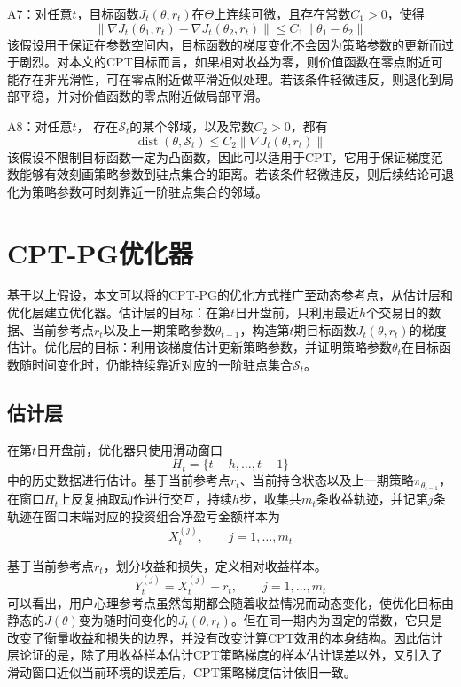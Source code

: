 A7：对任意$t$，目标函数$J_t(\theta,r_t)$在$\Theta$上连续可微，且存在常数$C_1>0$，使得
\begin{equation}
\|\nabla J_t(\theta_1,r_t)-\nabla J_t(\theta_2,r_t)\|
\le C_1\|\theta_1-\theta_2\|
\end{equation}
该假设用于保证在参数空间内，目标函数的梯度变化不会因为策略参数的更新而过于剧烈。对本文的CPT目标而言，如果相对收益为零，则价值函数在零点附近可能存在非光滑性，可在零点附近做平滑近似处理。若该条件轻微违反，则退化到局部平稳，并对价值函数的零点附近做局部平滑。

A8：对任意$t$，
存在$\mathcal S_t$的某个邻域，以及常数$C_2>0$，都有
\begin{equation}
\operatorname{dist}(\theta,\mathcal S_t)
\le
C_2\|\nabla J_t(\theta,r_t)\|
\end{equation}
该假设不限制目标函数一定为凸函数，因此可以适用于CPT，它用于保证梯度范数能够有效刻画策略参数到驻点集合的距离。若该条件轻微违反，则后续结论可退化为策略参数可时刻靠近一阶驻点集合的邻域。


\section{CPT-PG优化器}
基于以上假设，本文可以将\cite{Agnelli2017}的CPT-PG的优化方式推广至动态参考点，从估计层和优化层建立优化器。估计层的目标：在第$t$日开盘前，只利用最近$h$个交易日的数据、当前参考点$r_t$以及上一期策略参数$\theta_{t-1}$，构造第$t$期目标函数$J_t(\theta,r_t)$的梯度估计。优化层的目标：利用该梯度估计更新策略参数，并证明策略参数$\theta_t$在目标函数随时间变化时，仍能持续靠近对应的一阶驻点集合$\mathcal{S}_t$。
\subsection{估计层}
在第$t$日开盘前，优化器只使用滑动窗口
\begin{equation}
H_t=\{t-h,\dots,t-1\}
\end{equation}
中的历史数据进行估计。基于当前参考点$r_t$、当前持仓状态以及上一期策略$\pi_{\theta_{t-1}}$，在窗口$H_t$上反复抽取动作进行交互，持续$h$步，收集共$m_t$条收益轨迹，并记第$j$条轨迹在窗口末端对应的投资组合净盈亏金额样本为
\begin{equation}
X_t^{(j)}, \qquad j=1,\dots,m_t
\end{equation}

基于当前参考点$r_t$，划分收益和损失，定义相对收益样本。
\begin{equation}
Y_t^{(j)}=X_t^{(j)}-r_t, \qquad j=1,\dots,m_t
\end{equation}
可以看出，用户心理参考点虽然每期都会随着收益情况而动态变化，使优化目标由静态的$J(\theta)$变为随时间变化的$J_t(\theta,r_t)$。但在同一期内为固定的常数，它只是改变了衡量收益和损失的边界，并没有改变计算CPT效用的本身结构。因此估计层论证的是，除了用收益样本估计CPT策略梯度的样本估计误差以外，又引入了滑动窗口近似当前环境的误差后，CPT策略梯度估计依旧一致。

